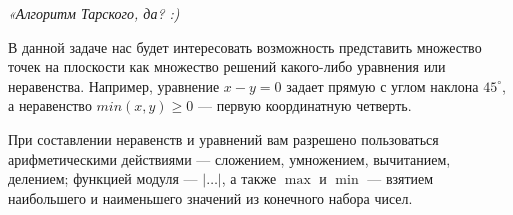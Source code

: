 ﻿

\begin{flushright} \itshape
	«Алгоритм Тарского, да? :)
\end{flushright}

\ms В данной задаче нас будет интересовать возможность представить множество точек на плоскости как множество решений какого-либо уравнения или неравенства. Например, уравнение $x - y = 0$ задает прямую с углом наклона $45^\circ$, а неравенство $min (x,y) \geq 0$ — первую координатную четверть.

\ms При составлении неравенств и уравнений вам разрешено пользоваться арифметическими действиями — сложением, умножением, вычитанием, делением; функцией модуля — $|\ldots|$, а также $\max$ и $\min$ — взятием наибольшего и наименьшего значений из конечного набора чисел.

